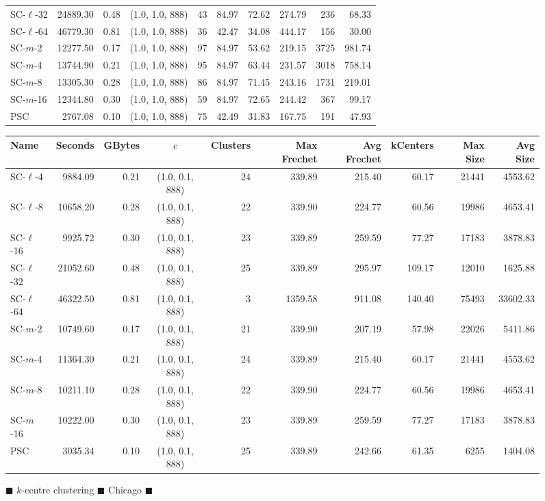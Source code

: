 \documentclass[11pt]{article}
\begin{document}
\begin{figure}
\begin{center}
\begin{minipage}{\textwidth}
{\begin{tabular}{@{}lrrcrrrrrr@{}}
        SC-$\ell$-32 & 24889.30 & 0.48 & (1.0, 1.0, 888) & 43 & 84.97 & 72.62 & 274.79 & 236 & 68.33\\
        SC-$\ell$-64 & 46779.30 & 0.81 & (1.0, 1.0, 888) & 36 & 42.47 & 34.08 & 444.17 & 156 & 30.00\\
        SC-$m$-2 & 12277.50 & 0.17 & (1.0, 1.0, 888) & 97 & 84.97 & 53.62 & 219.15 & 3725 & 981.74\\
        SC-$m$-4 & 13744.90 & 0.21 & (1.0, 1.0, 888) & 95 & 84.97 & 63.44 & 231.57 & 3018 & 758.14\\
        SC-$m$-8 & 13305.30 & 0.28 & (1.0, 1.0, 888) & 86 & 84.97 & 71.45 & 243.16 & 1731 & 219.01\\
        SC-$m$-16 & 12344.80 & 0.30 & (1.0, 1.0, 888) & 59 & 84.97 & 72.65 & 244.42 & 367 & 99.17\\
        PSC & 2767.08 & 0.10 & (1.0, 1.0, 888) & 75 & 42.49 & 31.83 & 167.75 & 191 & 47.93 \\
        \bottomrule
    \end{tabular}}
    {
    \begin{tabular}{@{}lrrcrrrrrr@{}}
        \toprule
        Name & Seconds & GBytes & $c$ & Clusters & Max Frechet & Avg Frechet & kCenters & Max Size & Avg Size\\
        \midrule
        SC-$\ell$-4 & 9884.09 & 0.21 & (1.0, 0.1, 888) & 24 & 339.89 & 215.40 & 60.17 & 21441 & 4553.62\\
        SC-$\ell$-8 & 10658.20 & 0.28 & (1.0, 0.1, 888) & 22 & 339.90 & 224.77 & 60.56 & 19986 & 4653.41\\
        SC-$\ell$-16 & 9925.72 & 0.30 & (1.0, 0.1, 888) & 23 & 339.89 & 259.59 & 77.27 & 17183 & 3878.83\\
        SC-$\ell$-32 & 21052.60 & 0.48 & (1.0, 0.1, 888) & 25 & 339.89 & 295.97 & 109.17 & 12010 & 1625.88\\
        SC-$\ell$-64 & 46322.50 & 0.81 & (1.0, 0.1, 888) & 3 & 1359.58 & 911.08 & 140.40 & 75493 & 33602.33\\
        SC-$m$-2 & 10749.60 & 0.17 & (1.0, 0.1, 888) & 21 & 339.90 & 207.19 & 57.98 & 22026 & 5411.86\\
        SC-$m$-4 & 11364.30 & 0.21 & (1.0, 0.1, 888) & 24 & 339.89 & 215.40 & 60.17 & 21441 & 4553.62\\
        SC-$m$-8 & 10211.10 & 0.28 & (1.0, 0.1, 888) & 22 & 339.90 & 224.77 & 60.56 & 19986 & 4653.41\\
        SC-$m$-16 & 10222.00 & 0.30 & (1.0, 0.1, 888) & 23 & 339.89 & 259.59 & 77.27 & 17183 & 3878.83\\
        PSC & 3035.34 & 0.10 & (1.0, 0.1, 888) & 25 & 339.89 & 242.66 & 61.35 & 6255 & 1404.08 \\
        \bottomrule
    \end{tabular}}
\end{minipage}
\end{center} 
        \caption{$\blacksquare$ $k$-centre clustering $\blacksquare$ Chicago   $\blacksquare$}
    \end{figure}
\end{document}
